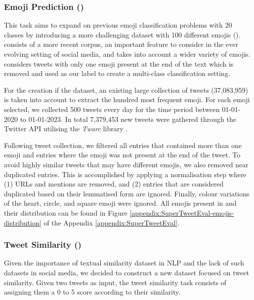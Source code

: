 \subsubsection{Emoji Prediction ({\TweetEmoji})}
\label{sec:emoji_classication}
This task aims to expand on previous emoji classification problems with 20 classes \cite{barbieri-etal-2017-emojis, barbieri-etal-2018-semeval} by introducing a more challenging dataset with 100 different emojis ({\TweetEmoji}). {\TweetEmoji} consists of a more recent corpus, an important feature to consider in the ever evolving setting of social media, and takes into account a wider variety of emojis. {\TweetEmoji} considers tweets with only one emoji present at the end of the text which is removed and used as our label to create a multi-class classification setting.

For the creation if the dataset, an existing large collection of tweets (37,083,959) \cite{loureiro-etal-2022-timelms} is taken into account to extract the hundred most frequent emoji. For each emoji selected, we collected 500 tweets every day for the time period between 01-01-2020 to 01-01-2023. In total 7,379,453 new tweets were gathered through the Twitter API utilising the \textit{Twarc} library \cite{twarc}.

Following tweet collection, we filtered all entries that contained more than one emoji and entries where the emoji was not present at the end of the tweet. To avoid highly similar tweets that may have different emojis, we also removed near duplicated entries. This is accomplished by applying a normalisation step where (1) URLs and mentions are removed, and (2) entries that are considered duplicated based on their lemmatised form are ignored. Finally, colour variations of the heart, circle, and square emoji were ignored. All emojis present in {\TweetEmoji} and their distribution can be found in Figure \ref{appendix:SuperTweetEval-emojis-distribution} of the Appendix \ref{appendix:SuperTweetEval}.

\subsubsection{Tweet Similarity ({\TweetSimilarity})}
\label{sec:tweet_similarity}
Given the importance of textual similarity dataset in NLP \cite{cer-etal-2017-semeval} and the lack of such datasets in social media, we decided to construct a new dataset focused on tweet similarity. Given two tweets as input, the tweet similarity task consists of assigning them a 0 to 5 score according to their similarity.

